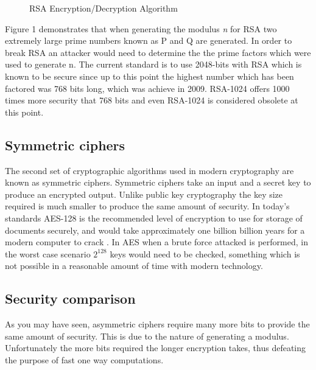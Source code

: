 \documentclass[fleqn, 12pt]{article}
\begin{document}
\begin{figure}[h]
    \begin{center}
        \caption{RSA Encryption/Decryption Algorithm \cite{rsa}}
        \label{fig:rsa}
    \end{center}
\end{figure}

\newpage

Figure 1 demonstrates that when generating the modulus \textit{n} for RSA two extremely large prime numbers known as P and Q are generated. In order to break RSA an attacker would need to determine the the prime factors which were used to generate n. The current standard is to use 2048-bits with RSA which is known to be secure since up to this point the highest number which has been factored was 768 bits long, which was achieve in 2009. RSA-1024 offers 1000 times more security that 768 bits and even RSA-1024 is considered obsolete at this point.

\subsection{Symmetric ciphers}

The second set of cryptographic algorithms used in modern cryptography are known as symmetric ciphers. Symmetric ciphers take an input and a secret key to produce an encrypted output. Unlike public key cryptography the key size required is much smaller to produce the same amount of security. In today's standards AES-128 is the recommended level of encryption to use for storage of documents securely, and would take approximately one billion billion years for a modern computer to crack \cite{aes}. In AES when a brute force attacked is performed, in the worst case scenario $2^{128}$ keys would need to be checked, something which is not possible in a reasonable amount of time with modern technology.

\subsection{Security comparison}

As you may have seen, asymmetric ciphers require many more bits to provide the same amount of security. This is due to the nature of generating a modulus. Unfortunately the more bits required the longer encryption takes, thus defeating the purpose of fast one way computations.
\end{document}
